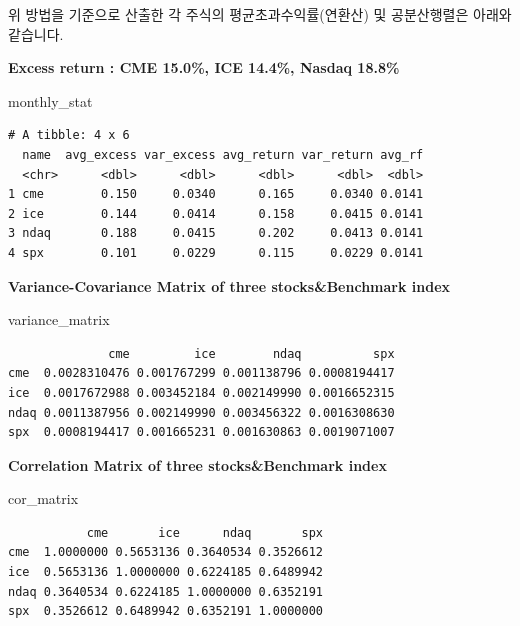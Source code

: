 \documentclass[
  letterpaper,
  DIV=11,
  numbers=noendperiod]{scrreprt}
\newenvironment{Shaded}{\begin{snugshade}}{\end{snugshade}}
\newcommand{\NormalTok}[1]{\textcolor[rgb]{0.00,0.23,0.31}{#1}}
\begin{document}
위 방법을 기준으로 산출한 각 주식의 평균초과수익률(연환산) 및
공분산행렬은 아래와 같습니다.

\textbf{Excess return : CME 15.0\%, ICE 14.4\%, Nasdaq 18.8\%}

\begin{Shaded}
\begin{Highlighting}[]
\NormalTok{monthly\_stat}
\end{Highlighting}
\end{Shaded}

\begin{verbatim}
# A tibble: 4 x 6
  name  avg_excess var_excess avg_return var_return avg_rf
  <chr>      <dbl>      <dbl>      <dbl>      <dbl>  <dbl>
1 cme        0.150     0.0340      0.165     0.0340 0.0141
2 ice        0.144     0.0414      0.158     0.0415 0.0141
3 ndaq       0.188     0.0415      0.202     0.0413 0.0141
4 spx        0.101     0.0229      0.115     0.0229 0.0141
\end{verbatim}

\textbf{Variance-Covariance Matrix of three stocks\&Benchmark index}

\begin{Shaded}
\begin{Highlighting}[]
\NormalTok{variance\_matrix}
\end{Highlighting}
\end{Shaded}

\begin{verbatim}
              cme         ice        ndaq          spx
cme  0.0028310476 0.001767299 0.001138796 0.0008194417
ice  0.0017672988 0.003452184 0.002149990 0.0016652315
ndaq 0.0011387956 0.002149990 0.003456322 0.0016308630
spx  0.0008194417 0.001665231 0.001630863 0.0019071007
\end{verbatim}

\textbf{Correlation Matrix of three stocks\&Benchmark index}

\begin{Shaded}
\begin{Highlighting}[]
\NormalTok{cor\_matrix}
\end{Highlighting}
\end{Shaded}

\begin{verbatim}
           cme       ice      ndaq       spx
cme  1.0000000 0.5653136 0.3640534 0.3526612
ice  0.5653136 1.0000000 0.6224185 0.6489942
ndaq 0.3640534 0.6224185 1.0000000 0.6352191
spx  0.3526612 0.6489942 0.6352191 1.0000000
\end{verbatim}
\end{document}
